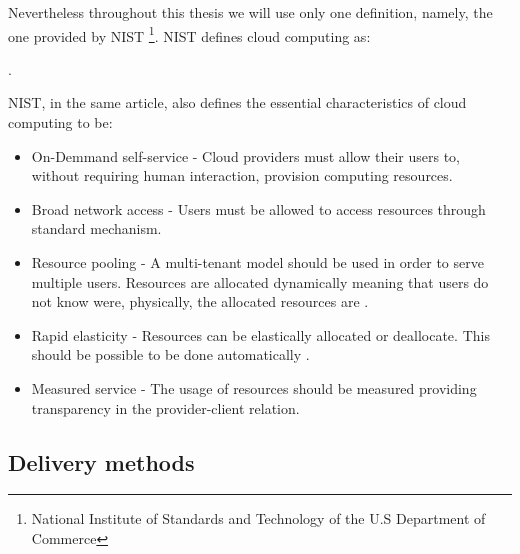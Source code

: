         Nevertheless throughout this thesis we will use only one definition, namely, the one provided by NIST \footnote{National Institute of Standards and Technology of the U.S Department of Commerce}. NIST defines cloud computing as: 
        
        . 
        
        NIST, in the same article, also defines the essential characteristics of cloud computing to be:
        \begin{itemize}
			\item{On-Demmand self-service} - Cloud providers must allow their users to, without requiring human interaction, provision computing resources.
            \item{Broad network access} - Users must be allowed to access resources through standard mechanism. 
            \item{Resource pooling} - A multi-tenant model should be used in order to serve multiple users. Resources are allocated dynamically meaning that users do not know were, physically, the allocated resources are \cite{Garrison2012}.
            
            \item{Rapid elasticity} - Resources can be elastically allocated or deallocate. This should be possible to be done automatically \cite{Garrison2012,Mell2011}.
            
            \item{Measured service} - The usage of resources should be measured providing transparency in the provider-client relation.

		\end{itemize}
        
        \subsection{Delivery methods} \label{chap:stateoftheheart:sec:cloud:sec:deliverymethods}
        
